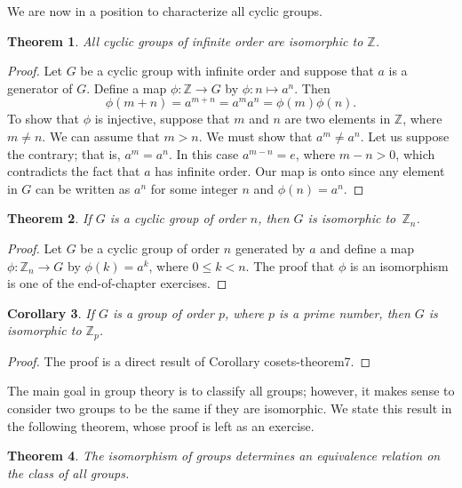 \documentclass[12pt]{article}
\newtheorem{thm}{Theorem}[section]
\newtheorem{cor}[thm]{Corollary}
\theoremstyle{plain}
\begin{document}
We are now in a position to characterize all cyclic groups.

\begin{thm}\label{isomorph_theorem_2}
All cyclic groups of infinite order are isomorphic to ${\mathbb Z}$.
\end{thm}

\begin{proof}
Let $G$ be a cyclic group with infinite order and suppose that $a$ is a generator of $G$.  Define a map $\phi : {\mathbb Z} \rightarrow  G$ by $\phi : n \mapsto a^n$. Then
\[
\phi( m+n ) = a^{m+n} = a^m a^n = \phi( m ) \phi( n ).
\]
To show that $\phi$ is injective, suppose that $m$ and $n$ are two elements in ${\mathbb Z}$, where $m \neq n$.  We can assume that $m > n$.  We must show that $a^m \neq a^n$. Let us suppose the contrary; that is, $a^m = a^n$. In this case $a^{m - n} = e$, where $m - n > 0$, which contradicts the fact that $a$ has infinite order.  Our map is onto since any element in $G$ can be written as $a^n$ for some integer $n$ and $\phi(n) = a^n$.
\end{proof}

\begin{thm}\label{isomorph_theorem_3}
If $G$ is a cyclic group of order $n$, then $G$ is isomorphic to~${\mathbb Z}_n$.
\end{thm}

\begin{proof}
Let $G$ be a cyclic group of order $n$ generated by $a$ and define a map $\phi : {\mathbb Z}_n \rightarrow  G$ by $\phi(k) = a^k$, where $0 \leq k < n$. The proof that $\phi$ is an isomorphism is one of the end-of-chapter exercises.
\end{proof}

\begin{cor}\label{isomorph_theorem_4}
If $G$ is a  group of order $p$, where $p$ is a prime number, then $G$ is isomorphic to ${\mathbb Z}_p$.
\end{cor}

\begin{proof}
The proof is a direct result of Corollary cosets-theorem7.
\end{proof}

\medskip

The main goal in group theory is to classify all groups; however, it makes sense to consider two groups to be the same if they are isomorphic.  We state this result in the following theorem, whose proof is left as an exercise.

\begin{thm}\label{isomorph_theorem_5}
The isomorphism of groups determines an equivalence relation on the class of all groups.
\end{thm}
\end{document}

